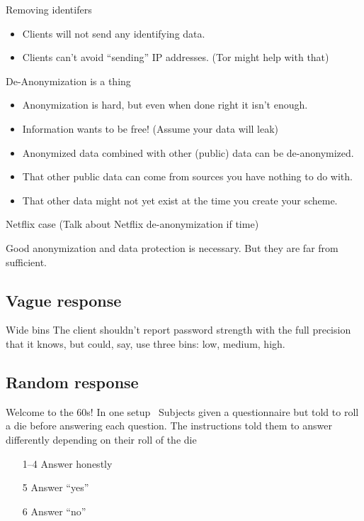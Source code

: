 \documentclass[xcolor={dvipsnames,table,hyperref}]{beamer}
\begin{document}
\begin{frame}{Removing identifers}
  \begin{itemize}
    \item Clients will not send any identifying data.
    \item Clients can't avoid “sending” IP addresses. (Tor might help with that)
  \end{itemize}
\end{frame}

\begin{frame}{De-Anonymization is a thing}
  \begin{itemize}
    \item Anonymization is hard, but even when done right it isn't enough.
    \item Information wants to be free! (Assume your data will leak)
    \item Anonymized data combined with other (public) data can be de-anonymized.
    \item That other public data can come from sources you have nothing to do with.
    \item That other data might not yet exist at the time you create your scheme.
  \end{itemize}
\end{frame}

\begin{frame}{Netflix case}
  (Talk about Netflix de-anonymization if time)
\end{frame}

\begin{frame}[standout]
  Good anonymization and data protection is necessary. But they are far from sufficient.
\end{frame}

\subsection{Vague response}

\begin{frame}{Wide bins}
  The client shouldn't report password strength with the full precision that it knows,
  but could, say, use three bins: low, medium, high.
\end{frame}

\subsection{Random response}

\begin{frame}{Welcome to the 60s!}
  In one setup~\cite{BBB:JoP79} Subjects given a questionnaire but told to roll a die before answering each question.
  The instructions told them to answer differently depending on their roll of the die
  \begin{itemize}
    \item[1--4] Answer honestly
    \item[5] Answer “yes”
    \item[6] Answer “no”
  \end{itemize}
\end{frame}
\end{document}
